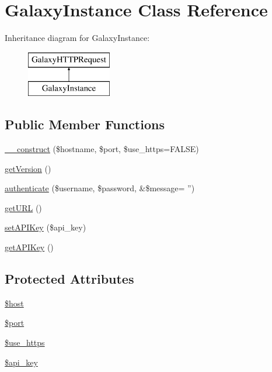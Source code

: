 \hypertarget{classGalaxyInstance}{\section{Galaxy\-Instance Class Reference}
\label{classGalaxyInstance}
}
Inheritance diagram for Galaxy\-Instance\-:\begin{figure}[H]
\begin{center}
\leavevmode
\includegraphics[height=2.000000cm]{classGalaxyInstance}
\end{center}
\end{figure}
\subsection*{Public Member Functions}
\begin{DoxyCompactItemize}
\item 
\hyperlink{classGalaxyInstance_a98d1b5f750ce3be53e96e435917b63b1}{\-\_\-\-\_\-construct} (\$hostname, \$port, \$use\-\_\-https=F\-A\-L\-S\-E)
\item 
\hyperlink{classGalaxyInstance_afbb7256306223f7f8ee85f85868e2de2}{get\-Version} ()
\item 
\hyperlink{classGalaxyInstance_a243315a49fd4ba0df8916b87872299ed}{authenticate} (\$username, \$password, \&\$message= '')
\item 
\hyperlink{classGalaxyInstance_a5b0c7191b82c21d857ec3d42068f3cf4}{get\-U\-R\-L} ()
\item 
\hyperlink{classGalaxyInstance_a4e4c854e91c21917adebec78a655edd3}{set\-A\-P\-I\-Key} (\$api\-\_\-key)
\item 
\hyperlink{classGalaxyInstance_a563deeb4f829462d7476d3684ed099cb}{get\-A\-P\-I\-Key} ()
\end{DoxyCompactItemize}
\subsection*{Protected Attributes}
\begin{DoxyCompactItemize}
\item 
\hyperlink{classGalaxyInstance_a68aaf747e0eae3b9338cd4c51711b514}{\$host}
\item 
\hyperlink{classGalaxyInstance_ab70c08b0781f835e1a2e4388b1baa639}{\$port}
\item 
\hyperlink{classGalaxyInstance_ab920cbfc8f2f63f3793ba067ee523ca8}{\$use\-\_\-https}
\item 
\hyperlink{classGalaxyInstance_a2a67b0838ca6175e9e01e3045b666caf}{\$api\-\_\-key}
\end{DoxyCompactItemize}


